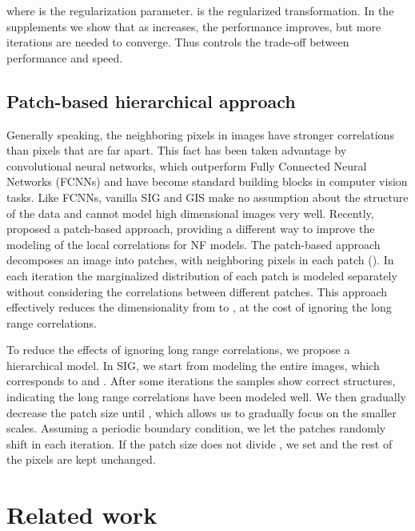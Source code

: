 \documentclass{article}
\begin{document}
where  is the regularization parameter.  is the regularized transformation. In the supplements we show that as  increases, the performance improves, but more iterations are needed to converge. Thus  controls the trade-off between performance and speed.







\subsection{Patch-based hierarchical approach}

\label{subsec:patch}

Generally speaking, the neighboring pixels in images have stronger correlations than pixels that are far apart. This fact has been taken advantage by convolutional neural networks, which outperform Fully Connected Neural Networks (FCNNs) and have become standard building blocks in computer vision tasks. Like FCNNs, vanilla SIG and GIS make no assumption about the structure of the data and cannot model high dimensional images very well. Recently, \citet{meng2020gaussianization} proposed a patch-based approach, providing a different way to improve the modeling of the local correlations for NF models. The patch-based approach decomposes an  image into  patches, with  neighboring pixels in each patch (). In each iteration the marginalized distribution of each patch is modeled separately without considering the correlations between different patches. This approach effectively reduces the dimensionality from  to , at the cost of ignoring the long range correlations.

To reduce the effects of ignoring long range correlations, we propose a hierarchical model. In SIG, we start from modeling the entire images, which corresponds to  and . After some iterations the samples show correct structures, indicating the long range correlations have been modeled well. We then gradually decrease the patch size  until , which allows us to gradually focus on the smaller scales. Assuming a periodic boundary condition, we let the patches randomly shift in each iteration. If the patch size  does not divide , we set  and the rest of the pixels are kept unchanged.

\section{Related work}

\label{sec:related}
\end{document}
